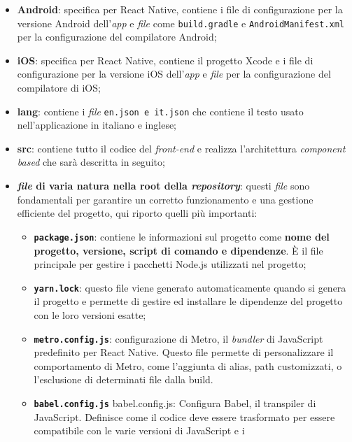 \begin{itemize}
    \item \textbf{Android}: specifica per React Native, contiene i file di configurazione 
          per la versione Android dell'\textit{app} e \textit{file} come \texttt{build.gradle} e \texttt{AndroidManifest.xml} 
          per la configurazione del compilatore Android;
    \item \textbf{iOS}: specifica per React Native, contiene il progetto Xcode e i file di configurazione 
          per la versione iOS dell'\textit{app} e \textit{file} per la configurazione del compilatore di iOS;
    \item \textbf{lang}: contiene i \textit{file} \texttt{en.json e it.json} che contiene il testo usato nell'applicazione 
          in italiano e inglese;
    \item \textbf{src}: contiene tutto il codice del \textit{front-end} e realizza l'architettura \textit{component 
          based} che sarà descritta in seguito;
    \item \textbf{\textit{file} di varia natura nella root della \textit{repository}}: questi \textit{file} sono fondamentali 
          per garantire un corretto funzionamento e una gestione efficiente del progetto, qui riporto quelli più importanti:
          \begin{itemize}
            \item \textbf{\texttt{package.json}}: contiene le informazioni sul progetto come \textbf{nome del progetto, versione,
                  script di comando e dipendenze}. È il file principale per gestire i pacchetti Node.js utilizzati nel progetto;
            \item \textbf{\texttt{yarn.lock}}: questo file viene generato automaticamente quando si genera il progetto e 
                  permette di gestire ed installare le dipendenze del progetto con le loro versioni esatte;
            \item \textbf{\texttt{metro.config.js}}: configurazione di Metro, il \textit{bundler} di JavaScript predefinito 
                  per React Native. Questo file permette di personalizzare il comportamento di Metro, come 
                  l'aggiunta di alias, path customizzati, o l'esclusione di determinati file dalla build.
            \item \textbf{\texttt{babel.config.js}} babel.config.js: Configura Babel, il transpiler di JavaScript. 
                  Definisce come il codice deve essere trasformato per essere compatibile con le varie versioni di JavaScript e i 

\end{itemize}
\end{itemize}
